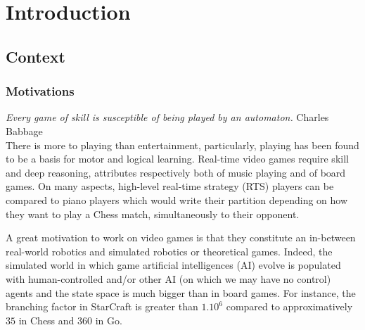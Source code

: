 \chapter{Introduction}


\section{Context}
\subsection{Motivations}
\textit{Every game of skill is susceptible of being played by an automaton.} Charles Babbage\\



There is more to playing than entertainment, particularly, playing has been found to be a basis for motor and logical learning. Real-time video games require skill and deep reasoning, attributes respectively both of music playing and of board games. On many aspects, high-level real-time strategy (RTS) players can be compared to piano players which would write their partition depending on how they want to play a Chess match, simultaneously to their opponent. 


A great motivation to work on video games is that they constitute an in-between real-world robotics and simulated robotics or theoretical games. Indeed, the simulated world in which game artificial intelligences (AI) evolve is populated with human-controlled and/or other AI (on which we may have no control) agents and the state space is much bigger than in board games. For instance, the branching factor in StarCraft is greater than $1.10^6$ compared to approximatively $35$ in Chess and $360$ in Go.


